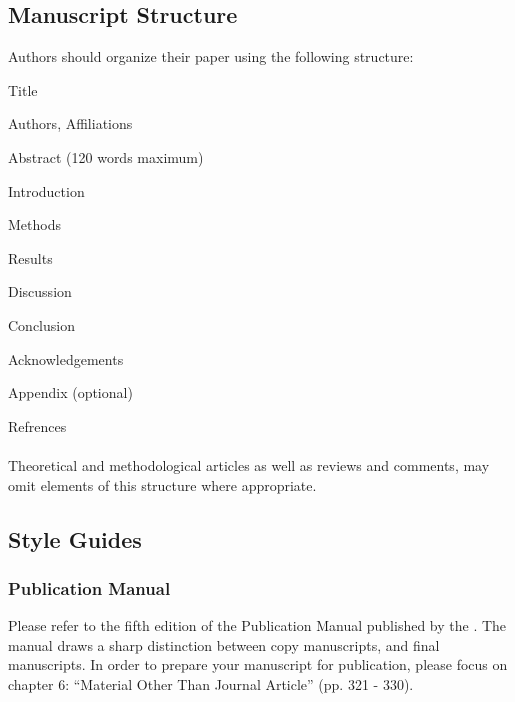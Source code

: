 \documentclass[jou,a4paper,notxfonts]{apa}
\begin{document}
\subsection{Manuscript Structure}
Authors should organize their paper using the following
structure:
\newline

       \begin{APAitemize}
       
        \item Title
        \item Authors, Affiliations
        \item Abstract (120 words maximum)
        \item Introduction
        \item Methods
        \item Results
        \item Discussion
        \item Conclusion
        \item Acknowledgements
        \item Appendix (optional)
        \item Refrences
        
       \end{APAitemize}

\paragraph{}
Theoretical and methodological articles as well as
reviews and comments, may omit elements of this structure
where appropriate.
   

\subsection{Style Guides}
\subsubsection{Publication Manual}
Please refer to the fifth edition of the Publication Manual published by the . The manual draws a
sharp distinction between copy manuscripts, and final
manuscripts. In order to prepare your manuscript for publication,
please focus on chapter 6: ``Material Other Than
Journal Article'' (pp. 321 - 330).
\end{document}
